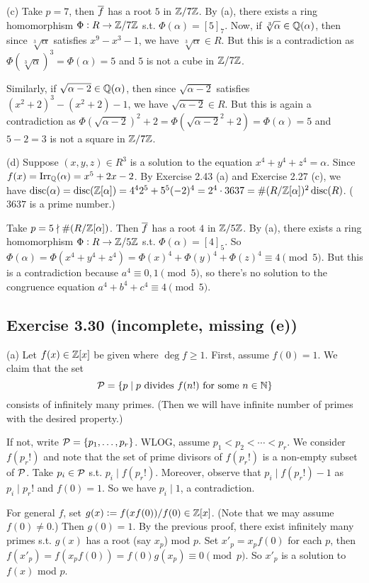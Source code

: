 \documentclass[../Marcus.tex]{subfiles}
\begin{document}
(c) Take $p=7$, then $\overline{f}$ has a root $5$ in $\mathbb{Z}/7\mathbb{Z}$. By (a), there exists a ring homomorphism $\Phi:R\to\mathbb{Z}/7\mathbb{Z}$ s.t. $\Phi(\alpha)=[5]_7$. Now, if $\sqrt[3]{\alpha}\in\mathbb{Q}(\alpha)$, then since $\sqrt[3]{\alpha}$ satisfies $x^9-x^3-1$, we have $\sqrt[3]{\alpha}\in R$. But this is a contradiction as $\Phi(\sqrt[3]{\alpha})^3=\Phi(\alpha)=5$ and $5$ is not a cube in $\mathbb{Z}/7\mathbb{Z}$.

Similarly, if $\sqrt{\alpha-2}\in\mathbb{Q}(\alpha)$, then since $\sqrt{\alpha-2}$ satisfies $(x^2+2)^3-(x^2+2)-1$, we have $\sqrt{\alpha-2}\in R$. But this is again a contradiction as $\Phi(\sqrt{\alpha-2})^2+2=\Phi(\sqrt{\alpha-2}^2+2)=\Phi(\alpha)=5$ and $5-2=3$ is not a square in $\mathbb{Z}/7\mathbb{Z}$.

(d) Suppose $(x,y,z)\in R^3$ is a solution to the equation $x^4+y^4+z^4=\alpha$. Since $f(x)=\operatorname{Irr}_{\mathbb{Q}}(\alpha)=x^5+2x-2$. By Exercise 2.43 (a) and Exercise 2.27 (c), we have $\operatorname{disc}(\alpha)=\operatorname{disc}(\mathbb{Z}[\alpha])=4^42^5+5^5(-2)^4=2^4\cdot 3637=\#(R/\mathbb{Z}[\alpha])^2\operatorname{disc}(R)$. ($3637$ is a prime number.)

Take $p=5\nmid \#(R/\mathbb{Z}[\alpha])$. Then $\overline{f}$ has a root $4$ in $\mathbb{Z}/5\mathbb{Z}$. By (a), there exists a ring homomorphism $\Phi:R\to\mathbb{Z}/5\mathbb{Z}$ s.t. $\Phi(\alpha)=[4]_5$. So $\Phi(\alpha)=\Phi(x^4+y^4+z^4)=\Phi(x)^4+\Phi(y)^4+\Phi(z)^4\equiv 4\pmod{5}$. But this is a contradiction because $a^4\equiv 0,1 \pmod{5}$, so there's no solution to the congruence equation $a^4+b^4+c^4\equiv 4\pmod{5}$.

\subsection*{Exercise 3.30 \color{red}(incomplete, missing (e))}

(a) Let $f(x)\in\mathbb{Z}[x]$ be given where $\deg f\geq1$. First, assume $f(0)=1$. We claim that the set
$$
\mathcal{P}=\{ p \mid p \text{ divides } f(n!) \text{ for some } n\in\mathbb{N}\}
$$
consists of infinitely many primes. (Then we will have infinite number of primes with the desired property.)

If not, write $\mathcal{P}=\{p_1,\ldots,p_r\}$. WLOG, assume $p_1<p_2<\cdots<p_r$. We consider $f(p_r!)$ and note that the set of prime divisors of $f(p_r!)$ is a non-empty subset of $\mathcal{P}$. Take $p_i\in\mathcal{P}$ s.t. $p_i\mid f(p_r!)$. Moreover, observe that $p_i\mid f(p_r!)-1$ as $p_i \mid p_r!$ and $f(0)=1$. So we have $p_i\mid 1$, a contradiction.

For general $f$, set $g(x):=f(xf(0))/f(0)\in\mathbb{Z}[x]$. (Note that we may assume $f(0)\neq0$.) Then $g(0)=1$. By the previous proof, there exist infinitely many primes s.t. $g(x)$ has a root (say $x_p$) mod $p$. Set $x'_p=x_pf(0)$ for each $p$, then $f(x'_p)=f(x_pf(0))=f(0)g(x_p)\equiv 0\pmod{p}$. So $x'_p$ is a solution to $f(x)$ mod $p$.
\end{document}

